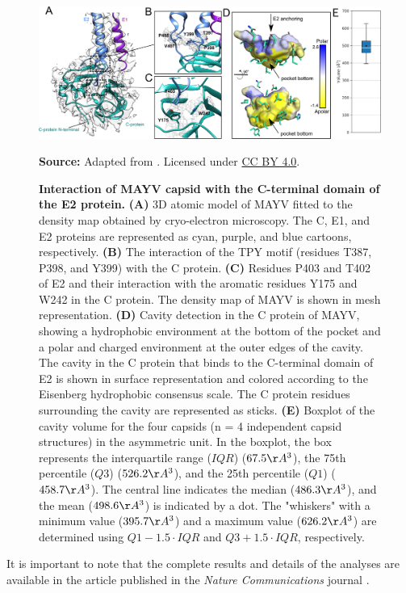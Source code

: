 \documentclass[Ingles]{phdthesis}
\begin{document}
\begin{figure}[hp]
  \centerline{\includegraphics[scale=0.23]{images/mayv-c-e2.png}}
  \centerline{\tiny{\textbf{Source:} Adapted from \cite{ribeiro2021}. Licensed under \href{https://creativecommons.org/licenses/by/4.0/}{CC BY 4.0}.}}
  \caption[Interaction of MAYV capsid with the C-terminal domain of the E2 protein]{\textbf{Interaction of MAYV capsid with the C-terminal domain of the E2 protein.} \textbf{(A)} 3D atomic model of \acs{MAYV} fitted to the density map obtained by cryo-electron microscopy. The C, E1, and E2 proteins are represented as cyan, purple, and blue cartoons, respectively. \textbf{(B)} The interaction of the TPY motif (residues T387, P398, and Y399) with the C protein. \textbf{(C)} Residues P403 and T402 of E2 and their interaction with the aromatic residues Y175 and W242 in the C protein. The density map of \acs{MAYV} is shown in mesh representation. \textbf{(D)} Cavity detection in the C protein of \acs{MAYV}, showing a hydrophobic environment at the bottom of the pocket and a polar and charged environment at the outer edges of the cavity. The cavity in the C protein that binds to the C-terminal domain of E2 is shown in surface representation and colored according to the Eisenberg hydrophobic consensus scale. The C protein residues surrounding the cavity are represented as sticks. \textbf{(E)} Boxplot of the cavity volume for the four capsids (n = 4 independent capsid structures) in the asymmetric unit. In the boxplot, the box represents the interquartile range ($IQR$) ($67.5 \AA^3$), the 75th percentile ($Q3$) ($526.2 \AA^3$), and the 25th percentile ($Q1$) ($458.7 \AA^3$). The central line indicates the median ($486.3 \AA^3$), and the mean ($498.6 \AA^3$) is indicated by a dot. The "whiskers" with a minimum value ($395.7 \AA^3$) and a maximum value ($626.2 \AA^3$) are determined using $Q1-1.5 \cdot IQR$ and $Q3+1.5 \cdot IQR$, respectively.}
  \label{fig:mayv-c-e2}
\end{figure}

It is important to note that the complete results and details of the analyses are available in the article published in the \textit{Nature Communications} journal \cite{ribeiro2021}.
\end{document}
